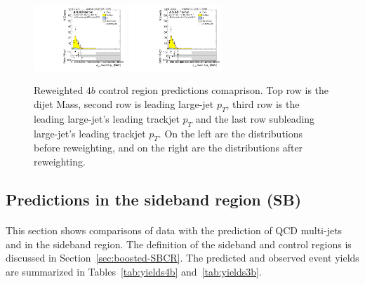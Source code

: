 \begin{figure}[htbp!]
\begin{center}
\includegraphics[width=0.31\textwidth,angle=-90]{figures/boosted/Prereweight/Moriond_FourTag_Control_sublHCand_trk0_Pt.pdf}
\includegraphics[width=0.31\textwidth,angle=-90]{figures/boosted/Control/b77_FourTag_Control_sublHCand_trk0_Pt.pdf}\\
\caption{Reweighted $4b$ control region predictions comaprison. Top row is the dijet Mass, second row is leading large-\R jet $p_{T}$, third row is the leading large-\R jet's leading trackjet $p_T$ and the last row subleading large-\R jet's leading trackjet $p_T$. On the left are the distributions before reweighting, and on the right are the distributions after reweighting.}
\label{fig:rw-4b-comp-cr}
\end{center}
\end{figure}


\subsection{Predictions in the sideband region (SB)}
\label{sec:boosted-sb}

\paragraph{}
This section shows comparisons of data with the prediction of QCD multi-jets and \ttbar in the sideband region. The definition of the sideband and control regions is discussed in Section~\ref{sec:boosted-SBCR}. The predicted and observed event yields are summarized in Tables~\ref{tab:yields4b} and~\ref{tab:yields3b}.

